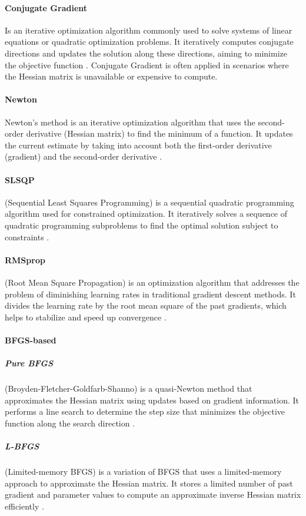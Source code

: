 \documentclass[a4paper]{article}
\begin{document}
	\paragraph{Conjugate Gradient}
	Is an iterative optimization algorithm commonly used to solve systems of linear equations or quadratic optimization problems.
	It iteratively computes conjugate directions and updates the solution along these directions, aiming to minimize the objective function \cite{Hestenes1952}.
	Conjugate Gradient is often applied in scenarios where the Hessian matrix is unavailable or expensive to compute.

	\paragraph{Newton}
	Newton's method is an iterative optimization algorithm that uses the second-order derivative (Hessian matrix) to find the minimum of a function.
	It updates the current estimate by taking into account both the first-order derivative (gradient) and the second-order derivative \cite{nocedal06}.
	
	\paragraph{SLSQP}
	(Sequential Least Squares Programming) is a sequential quadratic programming algorithm used for constrained optimization.
	It iteratively solves a sequence of quadratic programming subproblems to find the optimal solution subject to constraints \cite{Bonnans2006}.
	
	\paragraph{RMSprop}
	(Root Mean Square Propagation) is an optimization algorithm that addresses the problem of diminishing learning rates in traditional gradient descent methods.
	It divides the learning rate by the root mean square of the past gradients, which helps to stabilize and speed up convergence \cite{hinton2012}.
	
	\paragraph{BFGS-based}
	\subparagraph{Pure BFGS}
	(Broyden-Fletcher-Goldfarb-Shanno) is a quasi-Newton method that approximates the Hessian matrix using updates based on gradient information.
	It performs a line search to determine the step size that minimizes the objective function along the search direction \cite{fletcher1987}.
	\subparagraph{L-BFGS}
	(Limited-memory BFGS) is a variation of BFGS that uses a limited-memory approach to approximate the Hessian matrix.
	It stores a limited number of past gradient and parameter values to compute an approximate inverse Hessian matrix efficiently \cite{Liu1989}.
	
\end{document}

